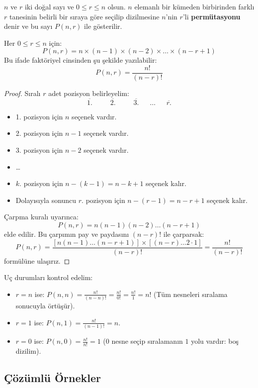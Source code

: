 \begin{definition}[Permütasyon: $P(n, r)$]
$n$ ve $r$ iki doğal sayı ve $0 \le r \le n$ olsun. $n$ elemanlı bir kümeden birbirinden farklı $r$ tanesinin belirli bir sıraya göre seçilip dizilmesine $n$'nin $r$'li \textbf{permütasyonu} denir ve bu sayı $P(n, r)$ ile gösterilir.
\end{definition}

\begin{theorem}
Her $0 \le r \le n$ için:
\[ P(n, r) = n \times (n-1) \times (n-2) \times \dots \times (n-r+1) \]
Bu ifade faktöriyel cinsinden şu şekilde yazılabilir:
\[ P(n, r) = \frac{n!}{(n-r)!} \]
\end{theorem}
\begin{proof}
Sıralı $r$ adet pozisyon belirleyelim:
\[ \overline{\quad 1. \quad} \;\; \overline{\quad 2. \quad} \;\; \overline{\quad 3. \quad} \;\; \dots \;\; \overline{\quad r. \quad} \]
\begin{itemize}
  \item 1. pozisyon için $n$ seçenek vardır.
  \item 2. pozisyon için $n-1$ seçenek vardır.
  \item 3. pozisyon için $n-2$ seçenek vardır.
  \item \dots
  \item $k$. pozisyon için $n - (k - 1) = n - k + 1$ seçenek kalır.
  \item Dolayısıyla sonuncu $r$. pozisyon için $n - (r - 1) = n - r + 1$ seçenek kalır.
\end{itemize}
Çarpma kuralı uyarınca:
\[ P(n, r) = n(n-1)(n-2)\dots(n-r+1) \]
elde edilir. Bu çarpımın pay ve paydasını $(n-r)!$ ile çarparsak:
\[ P(n, r) = \frac{[n(n-1)\dots(n-r+1)] \times [(n-r)\dots 2 \cdot 1]}{(n-r)!} = \frac{n!}{(n-r)!} \]
formülüne ulaşırız.
\end{proof}

Uç durumları kontrol edelim:
\begin{itemize}
  \item $r = n$ ise: $P(n, n) = \frac{n!}{(n-n)!} = \frac{n!}{0!} = \frac{n!}{1} = n!$ (Tüm nesneleri sıralama sonucuyla örtüşür).
  \item $r = 1$ ise: $P(n, 1) = \frac{n!}{(n-1)!} = n$.
  \item $r = 0$ ise: $P(n, 0) = \frac{n!}{n!} = 1$ ($0$ nesne seçip sıralamanın $1$ yolu vardır: boş dizilim).
\end{itemize}

\subsection{Çözümlü Örnekler}


